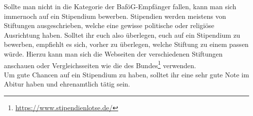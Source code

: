 Sollte man nicht in die Kategorie der BaföG-Empfänger fallen, kann man sich immernoch auf ein Stipendium bewerben. Stipendien werden meistens von Stiftungen ausgeschrieben, welche eine gewisse politische oder religiöse Ausrichtung haben. Solltet ihr euch also überlegen, euch auf ein Stipendium zu bewerben, empfiehlt es sich, vorher zu überlegen, welche Stiftung zu einem passen würde. Hierzu kann man sich die Webseiten der verschiedenen Stiftungen anschauen oder Vergleichsseiten wie die des Bundes\footnote{\url{https://www.stipendienlotse.de/}} verwenden.\\

Um gute Chancen auf ein Stipendium zu haben, solltet ihr eine sehr gute Note im Abitur haben und ehrenamtlich tätig sein.